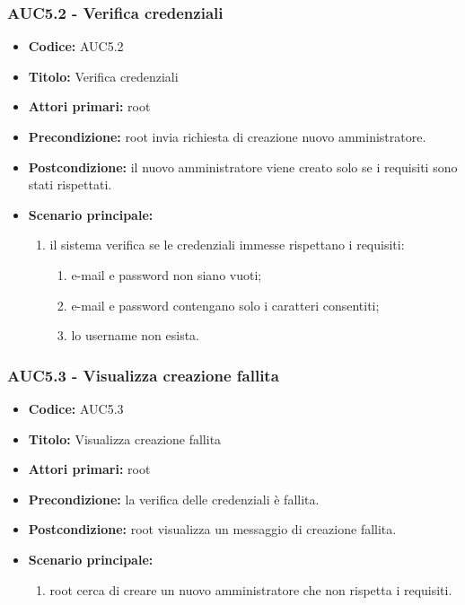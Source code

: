 \documentclass[casi-duso]{subfiles}
\begin{document}
\subsubsection{AUC5.2 - Verifica credenziali}%
\label{subsub:AUC5.2}
\begin{itemize}
  \item \textbf{Codice:} AUC5.2
  \item \textbf{Titolo:} Verifica credenziali
  \item \textbf{Attori primari:} root
  \item \textbf{Precondizione:} root invia richiesta di creazione nuovo amministratore.
  \item \textbf{Postcondizione:} il nuovo amministratore viene creato solo se i requisiti sono stati rispettati.
  \item \textbf{Scenario principale:}
  \begin{enumerate}
    \item il sistema verifica se le credenziali immesse rispettano i requisiti:
    \begin{enumerate}
      \item e-mail e password non siano vuoti;
      \item e-mail e password contengano solo i caratteri consentiti;
      \item lo username non esista.
    \end{enumerate}
  \end{enumerate}
\end{itemize}

\subsubsection{AUC5.3 - Visualizza creazione fallita}%
\label{subsub:AUC5.3}
\begin{itemize}
  \item \textbf{Codice:} AUC5.3
  \item \textbf{Titolo:} Visualizza creazione fallita
  \item \textbf{Attori primari:} root
  \item \textbf{Precondizione:} la verifica delle credenziali è fallita.
  \item \textbf{Postcondizione:} root visualizza un messaggio di creazione fallita.
  \item \textbf{Scenario principale:}
  \begin{enumerate}
    \item root cerca di creare un nuovo amministratore che non rispetta i requisiti.
  \end{enumerate}
\end{itemize}
\end{document}
